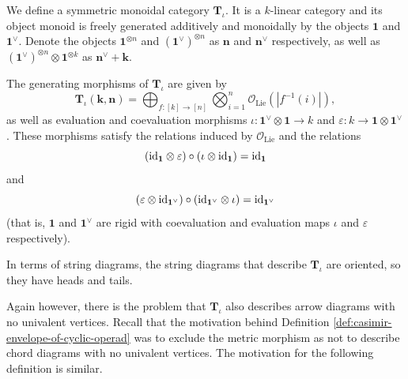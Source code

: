 \begin{definition}
	\label{def:2-coloured-eval-coeval-prop}
	We define a symmetric monoidal category \(\mathbf{T}_{\iota}\). It is a \(k\)-linear category and its object monoid is freely generated additively and monoidally by the objects \(\mathbf{1}\) and \(\mathbf{1}^{\vee}\). Denote the objects \(\mathbf{1}^{\otimes n}\) and \((\mathbf{1}^{\vee})^{\otimes n}\) as \(\mathbf{n}\) and \(\mathbf{n}^{\vee}\) respectively, as well as \((\mathbf{1}^{\vee})^{\otimes n} \otimes \mathbf{1}^{\otimes k}\) as \(\mathbf{n}^{\vee} + \mathbf{k}\).

	The generating morphisms of \(\mathbf{T}_{\iota}\) are given by
	\[
		\mathbf{T}_{\iota}(\mathbf{k}, \mathbf{n})
		=
		\bigoplus_{f: [k] \to [n]}
		\bigotimes_{i = 1}^{n}
		\mathcal{O}_{\text{Lie}}(|f^{-1}(i)|)
		,
	\]
	as well as evaluation and coevaluation morphisms \(\iota: \mathbf{1}^{\vee} \otimes \mathbf{1} \to k\) and \(\varepsilon : k \to \mathbf{1} \otimes \mathbf{1}^{\vee}\).
	These morphisms satisfy the relations induced by \(\mathcal{O}_{\text{Lie}}\) and the relations
	\[(\mathrm{id}_{\mathbf{1}} \otimes \varepsilon) \circ (\iota \otimes \mathrm{id}_{\mathbf{1}}) = \mathrm{id}_{\mathbf{1}}\]
	and
	\[(\varepsilon \otimes \mathrm{id}_{\mathbf{1}^{\vee}}) \circ (\mathrm{id}_{\mathbf{1}^{\vee}} \otimes \iota) = \mathrm{id}_{\mathbf{1}^{\vee}}\]
	(that is, \(\mathbf{1}\) and \(\mathbf{1}^{\vee}\) are rigid with coevaluation and evaluation maps \(\iota\) and \(\varepsilon\) respectively).
\end{definition}

In terms of string diagrams, the string diagrams that describe \(\mathbf{T}_{\iota}\) are oriented, so they have heads and tails.

Again however, there is the problem that \(\mathbf{T}_{\iota}\) also describes arrow diagrams with no univalent vertices. Recall that the motivation behind Definition \ref{def:casimir-envelope-of-cyclic-operad} was to exclude the metric morphism as not to describe chord diagrams with no univalent vertices. The motivation for the following definition is similar.

